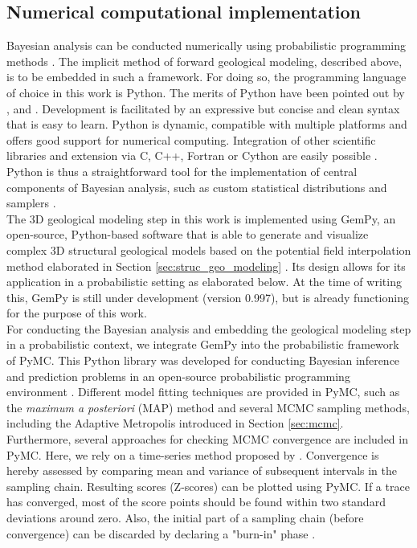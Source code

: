 		\subsection{Numerical computational implementation}\label{sec:numerical_implementation}
		Bayesian analysis can be conducted numerically using probabilistic programming methods \citep{salvatier2016pymc3}. The implicit method of forward geological modeling, described above, is to be embedded in such a framework. For doing so, the programming language of choice in this work is Python. The merits of Python have been pointed out by \citet{behnel2010}, \citet{Langtangen2008} and \citet{salvatier2016pymc3}. Development is facilitated by an expressive but concise and clean syntax that is easy to learn. Python is dynamic, compatible with multiple platforms and offers good support for numerical computing. Integration of other scientific libraries and extension via C, C++, Fortran or Cython are easily possible \citep{behnel2010, salvatier2016pymc3, Langtangen2008}. Python is thus a straightforward tool for the implementation of central components of Bayesian analysis, such as custom statistical distributions and samplers \citep{salvatier2016pymc3}.\\
		The 3D geological modeling step in this work is implemented using GemPy, an open-source, Python-based software that is able to generate and visualize complex 3D structural geological models based on the potential field interpolation method elaborated in Section \ref{sec:struc_geo_modeling} \citep{delaVarga2017gempy}. Its design allows for its application in a probabilistic setting as elaborated below. At the time of writing this, GemPy is still under development (version 0.997), but is already functioning for the purpose of this work.\\
		For conducting the Bayesian analysis and embedding the geological modeling step in a probabilistic context, we integrate GemPy into the probabilistic framework of PyMC. This Python library was developed for conducting Bayesian inference and prediction problems in an open-source probabilistic programming environment \citep{davidson2015, salvatier2016pymc3}. Different model fitting techniques are provided in PyMC, such as the \textit{maximum a posteriori} (MAP) method and several MCMC sampling methods, including the Adaptive Metropolis introduced in Section \ref{sec:mcmc}. Furthermore, several approaches for checking MCMC convergence are included in PyMC. Here, we rely on a time-series method proposed by \citet{geweke1991evaluating}. Convergence is hereby assessed by comparing mean and variance of subsequent intervals in the sampling chain. Resulting scores (Z-scores) can be plotted using PyMC. If a trace has converged, most of the score points should be found within two standard deviations around zero. Also, the initial part of a sampling chain (before convergence) can be discarded by declaring a "burn-in" phase \citep{geweke1991evaluating, patil2010pymc, davidson2015}.\\
